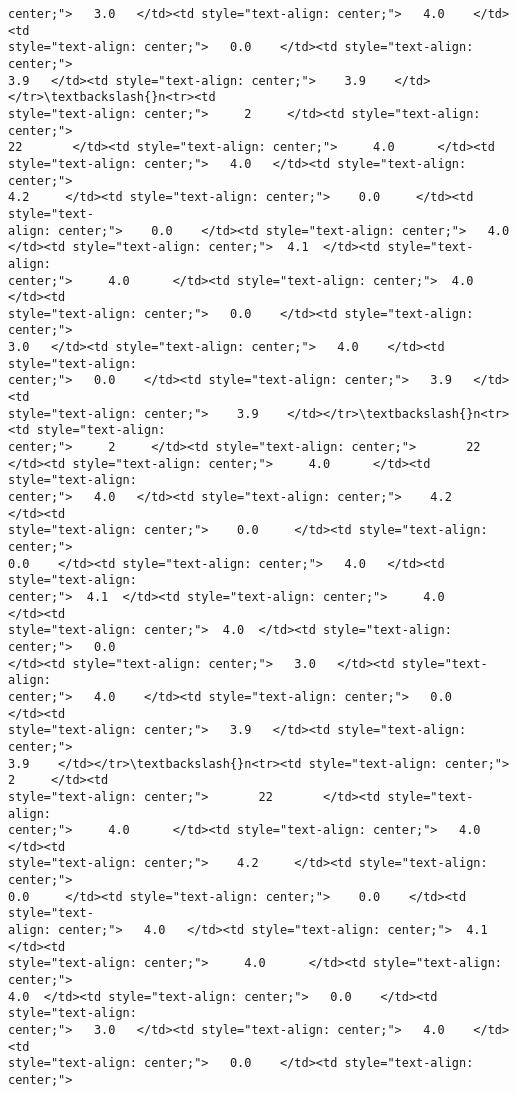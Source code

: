 \documentclass[11pt]{article}
\begin{document}
\begin{tcolorbox}[breakable, size=fbox, boxrule=.5pt, pad at break*=1mm, opacityfill=0]
\begin{Verbatim}[commandchars=\\\{\}]
center;">   3.0   </td><td style="text-align: center;">   4.0    </td><td
style="text-align: center;">   0.0    </td><td style="text-align: center;">
3.9   </td><td style="text-align: center;">    3.9    </td></tr>\textbackslash{}n<tr><td
style="text-align: center;">     2     </td><td style="text-align: center;">
22       </td><td style="text-align: center;">     4.0      </td><td
style="text-align: center;">   4.0   </td><td style="text-align: center;">
4.2     </td><td style="text-align: center;">    0.0     </td><td style="text-
align: center;">    0.0    </td><td style="text-align: center;">   4.0
</td><td style="text-align: center;">  4.1  </td><td style="text-align:
center;">     4.0      </td><td style="text-align: center;">  4.0  </td><td
style="text-align: center;">   0.0    </td><td style="text-align: center;">
3.0   </td><td style="text-align: center;">   4.0    </td><td style="text-align:
center;">   0.0    </td><td style="text-align: center;">   3.9   </td><td
style="text-align: center;">    3.9    </td></tr>\textbackslash{}n<tr><td style="text-align:
center;">     2     </td><td style="text-align: center;">       22
</td><td style="text-align: center;">     4.0      </td><td style="text-align:
center;">   4.0   </td><td style="text-align: center;">    4.2     </td><td
style="text-align: center;">    0.0     </td><td style="text-align: center;">
0.0    </td><td style="text-align: center;">   4.0   </td><td style="text-align:
center;">  4.1  </td><td style="text-align: center;">     4.0      </td><td
style="text-align: center;">  4.0  </td><td style="text-align: center;">   0.0
</td><td style="text-align: center;">   3.0   </td><td style="text-align:
center;">   4.0    </td><td style="text-align: center;">   0.0    </td><td
style="text-align: center;">   3.9   </td><td style="text-align: center;">
3.9    </td></tr>\textbackslash{}n<tr><td style="text-align: center;">     2     </td><td
style="text-align: center;">       22       </td><td style="text-align:
center;">     4.0      </td><td style="text-align: center;">   4.0   </td><td
style="text-align: center;">    4.2     </td><td style="text-align: center;">
0.0     </td><td style="text-align: center;">    0.0    </td><td style="text-
align: center;">   4.0   </td><td style="text-align: center;">  4.1  </td><td
style="text-align: center;">     4.0      </td><td style="text-align: center;">
4.0  </td><td style="text-align: center;">   0.0    </td><td style="text-align:
center;">   3.0   </td><td style="text-align: center;">   4.0    </td><td
style="text-align: center;">   0.0    </td><td style="text-align: center;">

\end{Verbatim}
\end{tcolorbox}
\end{document}
